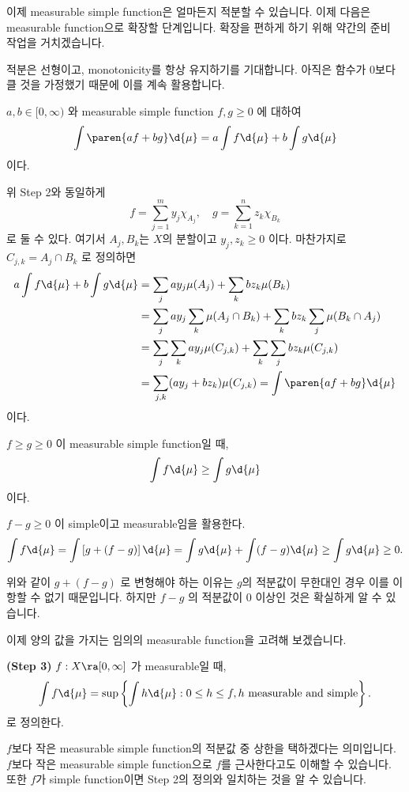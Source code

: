이제 measurable simple function은 얼마든지 적분할 수 있습니다. 이제 다음은 measurable function으로 확장할 단계입니다. 확장을 편하게 하기 위해 약간의 준비 작업을 거치겠습니다.

적분은 선형이고, monotonicity를 항상 유지하기를 기대합니다. 아직은 함수가 \(0\)보다 클 것을 가정했기 때문에 이를 계속 활용합니다.

\rmk \(a, b \in [0, \infty)\) 와 measurable simple function \(f, g \geq 0\) 에 대하여
\[
    \int \paren{af + bg} \d{\mu} = a \int f \d{\mu} + b \int g \d{\mu}
\]
이다.

\pf 위 Step 2와 동일하게
\[
    f = \sum_{j=1}^m y_j \chi_{A_j}, \quad g = \sum_{k=1}^n z_k \chi_{B_k}
\]
로 둘 수 있다. 여기서 \(A_j, B_k\)는 \(X\)의 분할이고 \(y_j, z_k \geq 0\) 이다. 마찬가지로 \(C_{j, k} = A_j \cap B_k\) 로 정의하면
\[
    \begin{aligned}
        a \int f \d{\mu} + b \int g \d{\mu} & = \sum_{j} ay_j \mu(A_j) + \sum_k b z_k \mu(B_k)                                 \\
                                            & = \sum_{j} ay_j \sum_k \mu(A_j \cap B_k) + \sum_k b z_k \sum_j \mu(B_k \cap A_j) \\
                                            & = \sum_{j} \sum_k ay_j \mu(C_{j, k}) + \sum_k \sum_j b z_k \mu(C_{j, k})         \\
                                            & = \sum_{j, k} (ay_j + bz_k) \mu(C_{j, k}) = \int \paren{af + bg} \d{\mu}
    \end{aligned}
\]
이다.

\rmk \(f \geq g \geq 0\) 이 measurable simple function일 때,
\[
    \int f \d{\mu} \geq \int g \d{\mu}
\]
이다.

\pf \(f - g \geq 0\) 이 simple이고 measurable임을 활용한다.
\[
    \int f \d{\mu} = \int \left[g + (f - g)\right] \d{\mu} = \int g\d{\mu} + \int (f - g) \d{\mu} \geq \int g \d{\mu} \geq 0.
\]

위와 같이 \(g + (f-g)\) 로 변형해야 하는 이유는 \(g\)의 적분값이 무한대인 경우 이를 이항할 수 없기 때문입니다. 하지만 \(f-g\) 의 적분값이 \(0\) 이상인 것은 확실하게 알 수 있습니다.

이제 양의 값을 가지는 임의의 measurable function을 고려해 보겠습니다.

\textbf{\sffamily (Step 3)} \(f: X \ra [0, \infty]\) 가 measurable일 때,
\[
    \int f \d{\mu} = \sup\left\{\int h \d{\mu}: 0\leq h \leq f, h \text{ measurable and simple}\right\}.
\]
로 정의한다.

\(f\)보다 작은 measurable simple function의 적분값 중 상한을 택하겠다는 의미입니다. \(f\)보다 작은 measurable simple function으로 \(f\)를 근사한다고도 이해할 수 있습니다. 또한 \(f\)가 simple function이면 Step 2의 정의와 일치하는 것을 알 수 있습니다.

